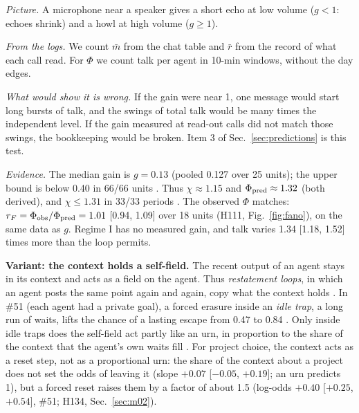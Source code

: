 \emph{Picture.} A microphone near a speaker gives a short echo at low volume ($g<1$: echoes shrink) and a howl at high volume ($g\ge1$).

\emph{From the logs.} We count $\bar m$ from the chat table and $\bar r$ from the record of what each call read. For $\Phi$ we count talk per agent in 10-min windows, without the day edges.

\emph{What would show it is wrong.} If the gain were near 1, one message would start long bursts of talk, and the swings of total talk would be many times the independent level. If the gain measured at read-out calls did not match those swings, the bookkeeping would be broken. Item 3 of Sec.~\ref{sec:predictions} is this test.

\emph{Evidence.} The median gain is $g=0.13$ (pooled 0.127 over 25 units); the upper bound is below 0.40 in 66/66 units . Thus $\chi\approx1.15$ and $\Phi_{\rm pred}\approx1.32$ (both derived), and $\chi\le1.31$ in 33/33 periods . The observed $\Phi$ matches: $r_F=\Phi_{\rm obs}/\Phi_{\rm pred}=1.01$ [0.94, 1.09] over 18 units (H111, Fig.~\ref{fig:fano}), on the same data as $g$. Regime I has no measured gain, and talk varies 1.34 [1.18, 1.52] times more than the loop permits.

\textbf{Variant: the context holds a self-field.} The recent output of an agent stays in its context and acts as a field on the agent. Thus \emph{restatement loops}, in which an agent posts the same point again and again, copy what the context holds . In \#51 (each agent had a private goal), a forced erasure inside an \emph{idle trap}, a long run of waits, lifts the chance of a lasting escape from 0.47 to 0.84 . Only inside idle traps does the self-field act partly like an urn, in proportion to the share of the context that the agent's own waits fill . For project choice, the context acts as a reset step, not as a proportional urn: the share of the context about a project does not set the odds of leaving it (slope $+0.07$ [$-0.05$, $+0.19$]; an urn predicts 1), but a forced reset raises them by a factor of about 1.5 (log-odds $+0.40$ [$+0.25$, $+0.54$], \#51; H134, Sec.~\ref{sec:m02}).

